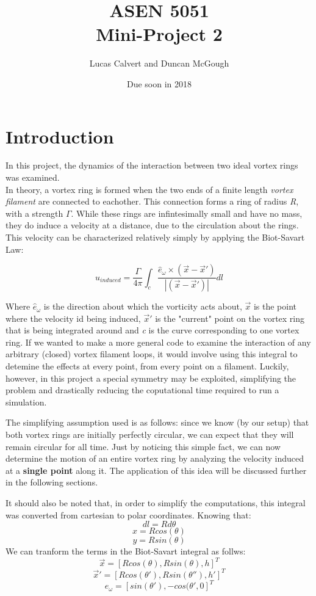\documentclass[10pt]{article}
\title{ASEN 5051\\ {\Large Mini-Project 2}}
\author{Lucas Calvert and Duncan McGough}
\date{Due soon in 2018}
\begin{document}
\maketitle

\tableofcontents
\listoffigures
\newpage

\section{Introduction}
In this project, the dynamics of the interaction between two ideal vortex rings was examined.\\

In theory, a vortex ring is formed when the two ends of a finite length \textit{vortex filament} are connected to eachother. This connection forms a ring of radius \textit{R}, with a strength $\Gamma$. While these rings are infintesimally small and have no mass, they do induce a velocity at a distance, due to the circulation about the rings. This velocity can be characterized relatively simply by applying the Biot-Savart Law:

\[ u_{induced} = \frac{\Gamma}{4\pi}\int_{c} \frac{\hat e_{\omega} \times (\vec x - \vec x')}{|(\vec x - \vec x')|} dl \]

Where $\hat e_{\omega}$ is the direction about which the vorticity acts about, $\vec x$ is the point where the velocity id being induced, $\vec x'$ is the "current" point on the vortex ring that is being integrated around and \textit{c} is the curve corresponding to one vortex ring. If we wanted to make a more general code to examine the interaction of any arbitrary (closed) vortex filament loops, it would involve using this integral to detemine the effects at every point, from every point on a filament. Luckily, however, in this project a special symmetry may be exploited, simplifying the problem and drastically reducing the coputational time required to run a simulation.

The simplifying assumption used is as follows: since we know (by our setup) that both vortex rings are initially perfectly circular, we can expect that they will remain circular for all time. Just by noticing this simple fact, we can now determine the motion of an entire vortex ring by analyzing the velocity induced at a \textbf{single point} along it. The application of this idea will be discussed further in the following sections.

It should also be noted that, in order to simplify the computations, this integral was converted from cartesian to polar coordinates. Knowing that: \[dl = Rd\theta\] \[x = Rcos(\theta)\] \[y = Rsin(\theta)\] We can tranform the terms in the Biot-Savart integral as follws: \[\vec x = [  Rcos(\theta) , Rsin(\theta)  , h  ]^T\] \[\vec x' = [  Rcos(\theta ') , Rsin(\theta '')  , h' ]^T\] \[e_{\omega} = [ sin(\theta ') , -cos(\theta '  , 0 ]^T\]
\end{document}

